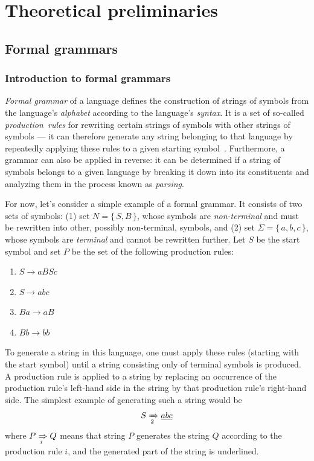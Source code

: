 \documentclass[english,bachelors,forcepolishlogotype]{wizthesis}
\begin{document}
\chapter{Theoretical preliminaries} \label{ch:theoretical-preliminaries}

\section{Formal grammars}

\subsection{Introduction to formal grammars}

\emph{Formal grammar} of a language defines the construction of strings of
symbols from the language's \emph{alphabet} according to the language's
\emph{syntax}. It is a set of so-called \emph{production~rules} for
rewriting certain strings of symbols with other strings of symbols --- it can
therefore generate any string belonging to that language by repeatedly applying
these rules to a given starting symbol~\cite{meduna-2014}. Furthermore, a
grammar can also be applied in reverse: it can be determined if a string of
symbols belongs to a given language by breaking it down into its constituents
and analyzing them in the process known as \emph{parsing}.

For now, let's consider a simple example of a formal grammar. It consists of two
sets of symbols: (1) set $N = \{\,S, B\,\}$, whose symbols are
\emph{non-terminal} and must be rewritten into other, possibly non-terminal,
symbols, and (2) set $\Sigma = \{\,a, b, c\,\}$, whose symbols are
\emph{terminal} and cannot be rewritten further. Let $S$ be the start symbol
and set $P$ be the set of the following production rules:
\begin{enumerate}[noitemsep]
  \item $S \rightarrow aBSc$
  \item $S \rightarrow abc$
  \item $Ba \rightarrow aB$
  \item $Bb \rightarrow bb$
\end{enumerate}
To generate a string in this language, one must apply these rules (starting with
the start symbol) until a string consisting only of terminal symbols is
produced. A production rule is applied to a string by replacing an occurrence
of the production rule's left-hand side in the string by that production rule's
right-hand side. The simplest example of generating such a string would be
\begin{equation*}
  S \xRightarrow[2]{} \underline{abc}
\end{equation*}
where $P \xRightarrow[i]{} Q$ means that string $P$ generates the string $Q$
according to the production rule $i$, and the generated part of the string
is underlined.
\end{document}
